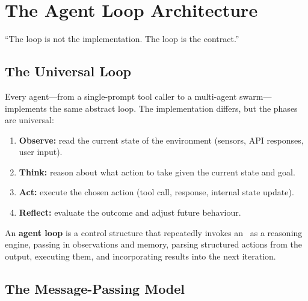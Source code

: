 \chapter{The Agent Loop Architecture}
\label{ch:agent-loop}

\epigraph{``The loop is not the implementation. The loop is the contract.''}{}


\section{The Universal Loop}

Every agent---from a single-prompt tool caller to a multi-agent swarm---implements the same abstract loop. The implementation differs, but the phases are universal:

\begin{enumerate}
	\item \textbf{Observe:} read the current state of the environment (sensors, API responses, user input).
	\item \textbf{Think:} reason about what action to take given the current state and goal.
	\item \textbf{Act:} execute the chosen action (tool call, response, internal state update).
	\item \textbf{Reflect:} evaluate the outcome and adjust future behaviour.
\end{enumerate}

\begin{definition}
	An \textbf{agent loop} is a control structure that repeatedly invokes an \llm\ as a reasoning engine, passing in observations and memory, parsing structured actions from the output, executing them, and incorporating results into the next iteration.
\end{definition}

\section{The Message-Passing Model}


